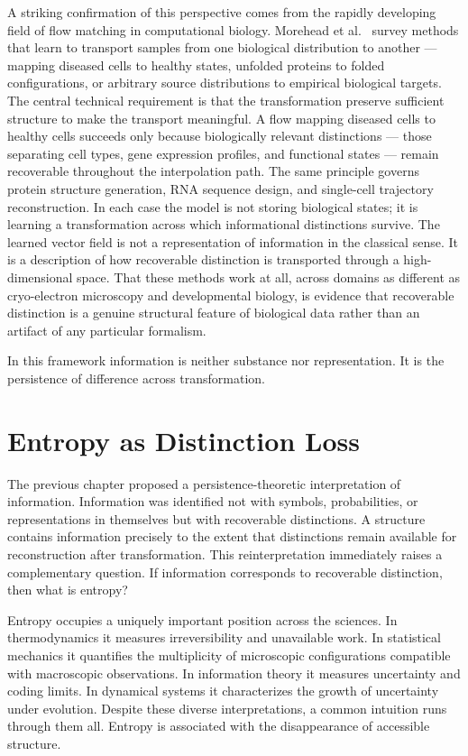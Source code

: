 \documentclass[12pt,oneside]{article}
\theoremstyle{definition}
\begin{document}
A striking confirmation of this perspective comes from the rapidly developing field of flow matching in computational biology. Morehead et al.~\cite{morehead2026} survey methods that learn to transport samples from one biological distribution to another --- mapping diseased cells to healthy states, unfolded proteins to folded configurations, or arbitrary source distributions to empirical biological targets. The central technical requirement is that the transformation preserve sufficient structure to make the transport meaningful. A flow mapping diseased cells to healthy cells succeeds only because biologically relevant distinctions --- those separating cell types, gene expression profiles, and functional states --- remain recoverable throughout the interpolation path. The same principle governs protein structure generation, RNA sequence design, and single-cell trajectory reconstruction. In each case the model is not storing biological states; it is learning a transformation across which informational distinctions survive. The learned vector field is not a representation of information in the classical sense. It is a description of how recoverable distinction is transported through a high-dimensional space. That these methods work at all, across domains as different as cryo-electron microscopy and developmental biology, is evidence that recoverable distinction is a genuine structural feature of biological data rather than an artifact of any particular formalism.

In this framework information is neither substance nor representation. It is the persistence of difference across transformation.

\section{Entropy as Distinction Loss}

The previous chapter proposed a persistence-theoretic interpretation of information. Information was identified not with symbols, probabilities, or representations in themselves but with recoverable distinctions. A structure contains information precisely to the extent that distinctions remain available for reconstruction after transformation. This reinterpretation immediately raises a complementary question. If information corresponds to recoverable distinction, then what is entropy?

Entropy occupies a uniquely important position across the sciences. In thermodynamics it measures irreversibility and unavailable work. In statistical mechanics it quantifies the multiplicity of microscopic configurations compatible with macroscopic observations. In information theory it measures uncertainty and coding limits. In dynamical systems it characterizes the growth of uncertainty under evolution. Despite these diverse interpretations, a common intuition runs through them all. Entropy is associated with the disappearance of accessible structure.
\end{document}
